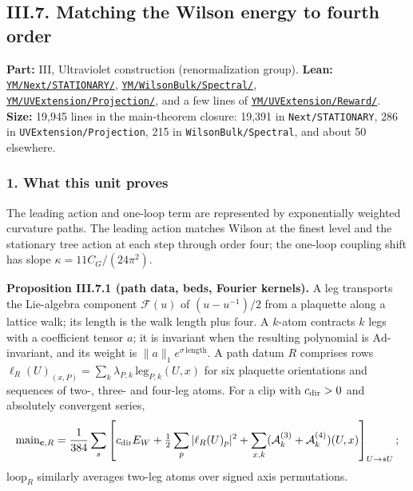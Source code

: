 \documentclass[
  letterpaper,
  11pt]{article}
\begin{document}
\subsection{III.7. Matching the Wilson energy to fourth
order}\label{iii.7.-matching-the-wilson-energy-to-fourth-order}

\textbf{Part:} III, Ultraviolet construction (renormalization group).
\textbf{Lean:}
\href{https://github.com/yang-mills-group/OpenAI-YM-20261028/tree/3456e5e75cf8d4cd558955a5c7638fba2d68f464/YM/Next/STATIONARY}{\texttt{YM/Next/STATIONARY/}},
\href{https://github.com/yang-mills-group/OpenAI-YM-20261028/tree/3456e5e75cf8d4cd558955a5c7638fba2d68f464/YM/WilsonBulk/Spectral}{\texttt{YM/WilsonBulk/Spectral/}},
\href{https://github.com/yang-mills-group/OpenAI-YM-20261028/tree/3456e5e75cf8d4cd558955a5c7638fba2d68f464/YM/UVExtension/Projection}{\texttt{YM/UVExtension/Projection/}},
and a few lines of
\href{https://github.com/yang-mills-group/OpenAI-YM-20261028/tree/3456e5e75cf8d4cd558955a5c7638fba2d68f464/YM/UVExtension/Reward}{\texttt{YM/UVExtension/Reward/}}.
\textbf{Size:} 19,945 lines in the main-theorem closure: 19,391 in
\texttt{Next/STATIONARY}, 286 in \texttt{UVExtension/Projection}, 215 in
\texttt{WilsonBulk/Spectral}, and about 50 elsewhere.

\subsubsection{1. What this unit proves}\label{what-this-unit-proves-9}

The leading action and one-loop term are represented by exponentially
weighted curvature paths. The leading action matches Wilson at the
finest level and the stationary tree action at each step through order
four; the one-loop coupling shift has slope \(\kappa=11C_G/(24\pi^2)\).

\textbf{Proposition III.7.1 (path data, beds, Fourier kernels).} A leg
transports the Lie-algebra component \(\mathcal F(u)\) of
\((u-u^{-1})/2\) from a plaquette along a lattice walk; its length is
the walk length plus four. A \(k\)-atom contracts \(k\) legs with a
coefficient tensor \(a\); it is invariant when the resulting polynomial
is \(\mathrm{Ad}\)-invariant, and its weight is
\(\|a\|_1e^{\sigma\,\mathrm{length}}\). A path datum \(R\) comprises
rows \(\ell_R(U)_{(x,P)}=\sum_k\lambda_{P,k}\,\mathrm{leg}_{P,k}(U,x)\)
for six plaquette orientations and sequences of two-, three- and
four-leg atoms. For a clip with \(c_{\rm dir}>0\) and absolutely
convergent series,
\[\mathrm{main}_{\mathbf c,R}=\frac1{384}\sum_s\left[c_{\rm dir}E_W+\tfrac12\sum_p|\ell_R(U)_p|^2+\sum_{x,k}(\mathcal A_k^{(3)}+\mathcal A_k^{(4)})(U,x)\right]_{U\to sU};\]
\(\mathrm{loop}_R\) similarly averages two-leg atoms over signed axis
permutations.
\end{document}
